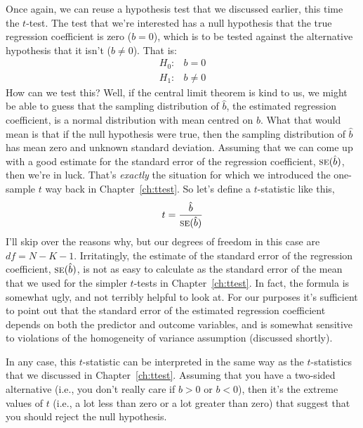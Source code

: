 Once again, we can reuse a hypothesis test that we discussed earlier, this time the $t$-test. The test that we're interested has a null hypothesis that the true regression coefficient is zero ($b = 0$), which is to be tested against the alternative hypothesis that it isn't ($b \neq 0$). That is:
$$
\begin{array}{rl}
H_0: & b = 0 \\
H_1: & b \neq 0 
\end{array}
$$
How can we test this? Well, if the central limit theorem is kind to us, we might be able to guess that the sampling distribution of $\hat{b}$, the estimated regression coefficient, is a normal distribution with mean centred on $b$. What that would mean is that if the null hypothesis were true, then the sampling distribution of $\hat{b}$ has mean zero and unknown standard deviation. Assuming that we can come up with a good estimate for the standard error of the regression coefficient, $\mbox{\textsc{se}}(\hat{b})$, then we're in luck. That's {\it exactly} the situation for which we introduced the one-sample $t$ way back in Chapter~\ref{ch:ttest}. So let's define a $t$-statistic like this,
$$
t = \frac{\hat{b}}{\mbox{\textsc{se}}(\hat{b})}
$$
I'll skip over the reasons why, but our degrees of freedom in this case are $df = N- K- 1$. Irritatingly, the estimate of the standard error of the regression coefficient, $\mbox{\textsc{se}}(\hat{b})$, is not as easy to calculate as the standard error of the mean that we used for the simpler $t$-tests in Chapter~\ref{ch:ttest}. In fact, the formula is somewhat ugly, and not terribly helpful to look at.
For our purposes it's sufficient to point out that the standard error of the  estimated regression coefficient depends on both the predictor and outcome variables, and is somewhat sensitive to violations of the homogeneity of variance assumption (discussed shortly). 

In any case, this $t$-statistic can be interpreted in the same way as the $t$-statistics that we discussed in Chapter~\ref{ch:ttest}. Assuming that you have a two-sided alternative (i.e., you don't really care if $b >0$ or $b < 0$), then it's the extreme values of $t$ (i.e., a lot less than zero or a lot greater than zero) that suggest that you should reject the null hypothesis. 


